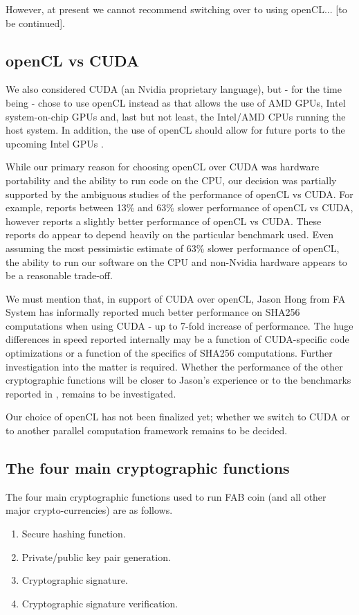 \documentclass{article}
\begin{document}
However, at present we cannot recommend switching over to using openCL... [to be continued].


\subsection{openCL vs CUDA}
We also considered CUDA (an Nvidia proprietary language), but - for the time being - chose to use openCL instead as that allows the use of AMD GPUs, Intel system-on-chip GPUs and, last but not least, the Intel/AMD CPUs running the host system. In addition, the use of openCL should allow for future ports to the upcoming Intel GPUs \cite{forbes:IntelGPUupcoming}. 

While our primary reason for choosing openCL over CUDA was hardware portability and the ability to run code on the CPU, our decision was partially supported by the ambiguous studies of the performance of openCL vs CUDA. For example, \cite{KarimiEtAl:DBLP:CUDAvsOpenCL} reports between 13\% and 63\% slower performance of openCL vs CUDA, however \cite{MemetiLPKK17:CUDAvsOpenCL:DBLP:journals/corr} reports a slightly better performance of openCL vs CUDA. These reports do appear to depend heavily on the particular benchmark used. Even assuming the most pessimistic estimate of 63\% slower performance of openCL, the ability to run our software on the CPU and non-Nvidia hardware appears to be a reasonable trade-off. 

We must mention that, in support of CUDA over openCL, Jason Hong from FA System has informally reported much better performance on SHA256 computations when using CUDA - up to 7-fold increase of performance. The huge differences in speed reported internally may be a function of CUDA-specific code optimizations or a function of the specifics of SHA256 computations. Further investigation into the matter is required. Whether the performance of the other cryptographic functions will be closer to Jason's experience or to the benchmarks reported in \cite{KarimiEtAl:DBLP:CUDAvsOpenCL}, \cite{MemetiLPKK17:CUDAvsOpenCL:DBLP:journals/corr} remains to be investigated.

Our choice of openCL has not been finalized yet; whether we switch to CUDA or to another parallel computation framework remains to be decided.


\subsection{The four main cryptographic functions} \label{sectionFourMainCrypto}
The four main cryptographic functions used to run FAB coin (and all other major crypto-currencies) are as follows.
\begin{enumerate}
\item \label{enumFourMainSHA} Secure hashing function.
\item \label{enumFourMainPrivatePublicKeyGeneration} Private/public key pair generation.
\item \label{enumFourMainCryptoSignature} Cryptographic signature.
\item \label{enumFourMainVerification} Cryptographic signature verification.
\end{enumerate}
\end{document}
